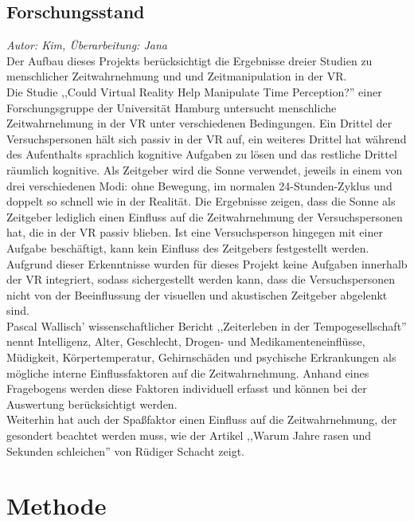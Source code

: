 \documentclass{Paper}
\begin{document}
\subsection{Forschungsstand}
\textit{Autor: Kim, Überarbeitung: Jana}\\
Der Aufbau dieses Projekts berücksichtigt die Ergebnisse dreier Studien zu menschlicher Zeitwahrnehmung und und Zeitmanipulation in der VR.\\
Die Studie ,,Could Virtual Reality Help Manipulate Time Perception?'' einer Forschungsgruppe der Universität Hamburg untersucht menschliche Zeitwahrnehmung in der VR unter verschiedenen Bedingungen. Ein Drittel der Versuchspersonen hält sich passiv in der VR auf, ein weiteres Drittel hat während des Aufenthalts sprachlich kognitive Aufgaben zu lösen und das restliche Drittel räumlich kognitive. 
Als Zeitgeber wird die Sonne verwendet, jeweils in einem von drei verschiedenen Modi: ohne Bewegung, im normalen 24-Stunden-Zyklus und doppelt so schnell wie in der Realität. Die Ergebnisse zeigen, dass die Sonne als Zeitgeber lediglich einen Einfluss auf die Zeitwahrnehmung der Versuchspersonen hat, die in der VR passiv blieben. Ist eine Versuchsperson hingegen mit einer Aufgabe beschäftigt, kann kein Einfluss des Zeitgebers festgestellt werden.\cite{DeviceSystems2016}
Aufgrund dieser Erkenntnisse wurden für dieses Projekt keine Aufgaben innerhalb der VR integriert, sodass sichergestellt werden kann, dass die Versuchspersonen nicht von der Beeinflussung der visuellen und akustischen Zeitgeber abgelenkt sind.\\
Pascal Wallisch' wissenschaftlicher Bericht ,,Zeiterleben in der Tempogesellschaft'' nennt Intelligenz, Alter, Geschlecht, Drogen- und Medikamenteneinflüsse, Müdigkeit, Körpertemperatur, Gehirnschäden und psychische Erkrankungen als mögliche interne Einflussfaktoren auf die Zeitwahrnehmung.\cite{Wallisch2003} 
Anhand eines Fragebogens werden diese Faktoren individuell erfasst und können bei der Auswertung berücksichtigt werden.\\
Weiterhin hat auch der Spaßfaktor einen Einfluss auf die Zeitwahrnehmung, der gesondert beachtet werden muss, wie der Artikel ,,Warum Jahre rasen und Sekunden schleichen'' von Rüdiger Schacht zeigt. \cite{Welt24}

\section{Methode}
\end{document}
